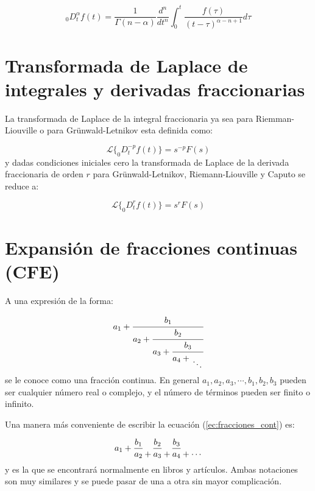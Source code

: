 	\begin{equation}
		_{0}D_{t}^{\alpha}f(t) = \frac{1}{\Gamma(n-\alpha)} \frac{d^{n}}{dt^{n}} \int_{0}^{t} \frac{f(\tau)}{(t - \tau)^{\alpha - n + 1}} d\tau
	\end{equation}
		
	\section{Transformada de Laplace de integrales y derivadas fraccionarias}
	
	La transformada de Laplace de la integral fraccionaria ya sea para Riemman-Liouville o para Grünwald-Letnikov esta definida como:
	
	\begin{equation}
	 	\mathcal{L} \{ _{0}D_{t}^{-p} f(t) \} = s^{-p} F(s)
	\end{equation} 
	y dadas condiciones iniciales cero  la transformada de Laplace de la derivada fraccionaria de orden $r$ para Grünwald-Letnikov, Riemann-Liouville y Caputo se reduce a:
	
	\begin{equation}
		\mathcal{L} \{ _{0}D_{t}^{r} f(t) \} = s^{r} F(s)
	\end{equation}
	
	
	\section{Expansión de fracciones continuas (CFE)}
	
	A una expresión de la forma:

	\begin{equation}
		a_{1} + \cfrac{b_{1}}{a_{2} + \cfrac{b_{2}}{a_{3} + \cfrac{b_{3}}{a_{4} + \genfrac{}{}{0pt}{0}{}{\ddots}}}}
		\label{ec:fracciones_cont}
	\end{equation} 
	se le conoce como una fracción continua. En general $a_{1},a_{2},a_{3}, \cdots, b_{1}, b_{2}, b_{3}$ pueden ser cualquier número real o complejo, y el número de términos pueden ser finito o infinito.

	Una manera más conveniente de escribir la ecuación (\ref{ec:fracciones_cont}) es:

	\begin{equation}
		a_{1} + \frac{b_{1}}{a_{2} } \genfrac{}{}{0pt}{0}{}{+}   \frac{b_{2}}{a_{3}}  \genfrac{}{}{0pt}{0}{}{+}  \frac{b_{3}}{a_{4}}  \genfrac{}{}{0pt}{0}{}{+}  \genfrac{}{}{0pt}{0}{}{\cdots} 
		\label{ec:fracciones_cont_sim}
	\end{equation}
	y es la que se encontrará normalmente en libros y artículos. Ambas notaciones son  muy similares y se puede pasar de una a otra sin mayor complicación.

